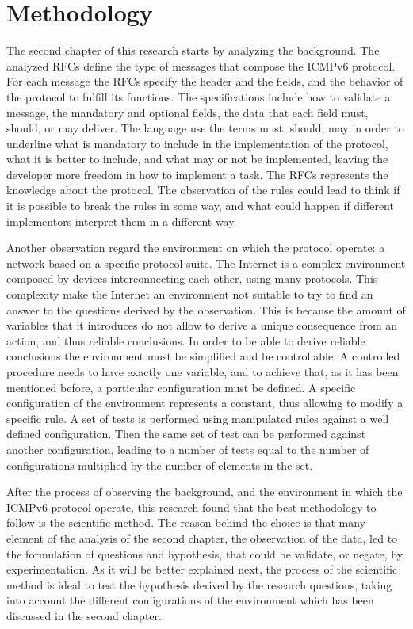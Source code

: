 \documentclass[12pt]{article}
\begin{document}
\pagebreak

\section{Methodology}
\label{sec:3}

The second chapter of this research starts by analyzing the background. The analyzed RFCs define the type of messages that compose the ICMPv6 protocol. For each message the RFCs specify the header and the fields, and the behavior of the protocol to fulfill its functions. The specifications include how to validate a message, the mandatory and optional fields, the data that each field must, should, or may deliver. The language use the terms must, should, may in order to underline what is mandatory to include in the implementation of the protocol, what it is better to include, and what may or not be implemented, leaving the developer more freedom in how to implement a task. The RFCs represents the knowledge about the protocol. The observation of the rules could lead to think if it is possible to break the rules in some way, and what could happen if different implementors interpret them in a different way.

Another observation regard the environment on which the protocol operate: a network based on a specific protocol suite. The Internet is a complex environment composed by devices interconnecting each other, using many protocols. This complexity make the Internet an environment not suitable to try to find an answer to the questions derived by the observation. This is because the amount of variables that it introduces do not allow to derive a unique consequence from an action, and thus reliable conclusions. In order to be able to derive reliable conclusions the environment must be simplified and be controllable. A controlled procedure needs to have exactly one variable, and to achieve that, as it has been mentioned before, a particular configuration must be defined. A specific configuration of the environment represents a constant, thus allowing to modify a specific rule. A set of tests is performed using manipulated rules against a well defined configuration. Then the same set of test can be performed against another configuration, leading to a number of tests equal to the number of configurations multiplied by the number of elements in the set.\cite{secExperiments}

After the process of observing the background, and the environment in which the ICMPv6 protocol operate, this research found that the best methodology to follow is the scientific method. The reason behind the choice is that many element of the analysis of the second chapter, the observation of the data, led to the formulation of questions and hypothesis, that could be validate, or negate, by experimentation. As it will be better explained next, the process of the scientific method is ideal to test the hypothesis derived by the research questions, taking into account the different configurations of the environment which has been discussed in the second chapter.
\end{document}
